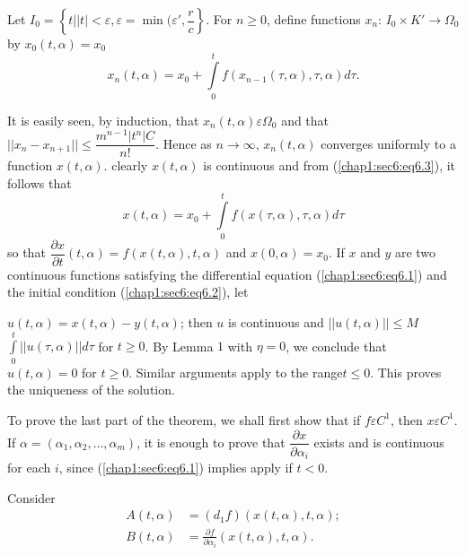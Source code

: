 Let $I _0 = \left \{ t \big | |t| < \varepsilon , \varepsilon = \min (
\varepsilon' , 
\dfrac{r}{c}\right \}$. For $n \ge 0$, define functions $x_n$: $I_0
\times K' \to \Omega_0$ by $x_ 0(t, \alpha) = x_0$ 
\begin{equation}
  x_n (t, \alpha) = x_0 + \int\limits_{0}^t f(x_{n- 1} (\tau, \alpha),
  \tau, \alpha ) d \tau. \tag{6.3}\label{chap1:sec6:eq6.3} 
\end{equation}

It is easily seen, by induction, that $x_n (t, \alpha) \varepsilon \Omega_0$
and that $|| x_n - x_{n +1} || \le \dfrac{m^{n-1} |t^n| C}{n
  !}$. Hence as $n \to \infty$, $x_n (t, \alpha)$ converges uniformly
to a function $x (t, \alpha)$. clearly $x(t, \alpha)$ is continuous and
from (\ref{chap1:sec6:eq6.3}), it follows that  
$$
x(t, \alpha ) = x_0 + \int\limits_0^t f(x(\tau, \alpha), \tau, \alpha
) d \tau 
$$
so that $\dfrac{\partial x}{\partial t}(t, \alpha) = f(x(t, \alpha ),
t, \alpha)$ and $x(0, \alpha) = x_0$. If $x$ and $y$ are two
continuous functions satisfying the differential equation
(\ref{chap1:sec6:eq6.1}) and 
the initial condition (\ref{chap1:sec6:eq6.2}), let 

$u (t, \alpha) = x(t, \alpha) - y (t, \alpha)$; then $u$ is continuous
and $|| u (t, \alpha) || \le M$ $\int\limits_{0}^t || u (\tau, \alpha )
|| d \tau$ for $t \ge 0$. By Lemma $1$ with $\eta = 0$, we conclude
that $u (t, \alpha) = 0$ for $t \ge 0$. Similar arguments apply to the
range\pageoriginale $t \le 0$. This proves the uniqueness of the solution. 

To prove the last part of the theorem, we shall first show that if $f
\varepsilon C^1$, then $x \varepsilon C^1$. If $\alpha = (\alpha_1, \alpha_2, \ldots ,
\alpha_m)$, it is enough to prove that $\dfrac{\partial x}{\partial
  \alpha_i}$ exists and is continuous for each $i$, since
(\ref{chap1:sec6:eq6.1}) implies apply if $t < 0$. 

Consider
\begin{align*}
  A (t, \alpha ) & = (d_1 f )(x (t, \alpha ), t, \alpha );\\
  B (t, \alpha ) & = \frac{\partial f}{\partial \alpha_i} (x(t, \alpha
  ), t, \alpha ). 
\end{align*}

